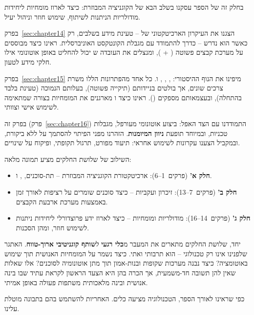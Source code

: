 בחלק זה של הספר עסקנו בשלב הבא של הקוגניציה המבוזרת: כיצד לארוז מומחיות ליחידות מודולריות הניתנות לשיתוף, שימוש חוזר וניהול יעיל.

בפרק~\ref{sec:chapter14} הצגנו את העיקרון הארכיטקטוני של  – טעינת מידע בשלבים, רק כאשר הוא נדרש – כדרך להתמודד עם מגבלת הקונטקסט האוניברסלית. ראינו כיצד  מבוססים על מערכת קבצים פשוטה ( + ), ומנצלים את העובדה ש יכול להחליט באופן אוטונומי אילו חלקי מידע לטעון.

בפרק~\ref{sec:chapter15} מיפינו את הנוף ההיסטורי: , , , ו. כל אחד מהפתרונות הללו משרת צרכים שונים, אך  בולטים בניידותם (תיקייה פשוטה), בעלותם הנמוכה (טעינת  בלבד בהתחלה), ובעצמאותם מספקים (). ראינו כיצד  ו מארגנים את המומחיות בצורה שמתאימה לשימוש אישי וצוותי.

בפרק זה (פרק~\ref{sec:chapter16}) התמודדנו עם הצד האפל: ביצוע אוטונומי מעורפל, מגבלות טכניות, ובמיוחד תופעת \textbf{ניוון המיומנות}. הזהרנו מפני הפיתוי להסתמך על  ללא ביקורת, ובמקביל הצענו עקרונות לשימוש אחראי: תיעוד מפורט, תרגול תקופתי, ופיקוח על שינויים.

השילוב של שלושת החלקים מציע תמונה מלאה:

\begin{itemize}
  \item \textbf{חלק א'} (פרקים~\num{1}–\num{6}): ארכיטקטורת הקוגניציה המבוזרת – תת-סוכנים, , ו.
  \item \textbf{חלק ב'} (פרקים~\num{7}–\num{13}): זיכרון ועקביות – כיצד סוכנים שומרים על רציפות לאורך זמן באמצעות מערכת ארבעת הקבצים.
  \item \textbf{חלק ג'} (פרקים~\num{14}–\num{16}): מודולריות ומומחיות – כיצד לארוז ידע פרוצדורלי ליחידות ניתנות לשימוש חוזר, ומהן הסכנות.
\end{itemize}

יחד, שלושת החלקים מתארים את המעבר מ\textbf{כלי רגעי} ל\textbf{שותף קוגניטיבי ארוך-טווח}. האתגר שלפנינו אינו רק טכנולוגי – הוא תרבותי ואתי. כיצד נשמר על המומחיות האנושית תוך שימוש באוטומציה? כיצד נבנה מערכות שקופות ובנות-אמון תוך מתן אוטונומיה לסוכנים? אלו שאלות שאין להן תשובה חד-משמעית, אך הכרה בהן היא הצעד הראשון לקראת עתיד שבו בינה אנושית ובינה מלאכותית משתפות פעולה באופן אמיתי.

כפי שראינו לאורך הספר, הטכנולוגיה מציעה כלים. האחריות להשתמש בהם בתבונה מוטלת עלינו.

